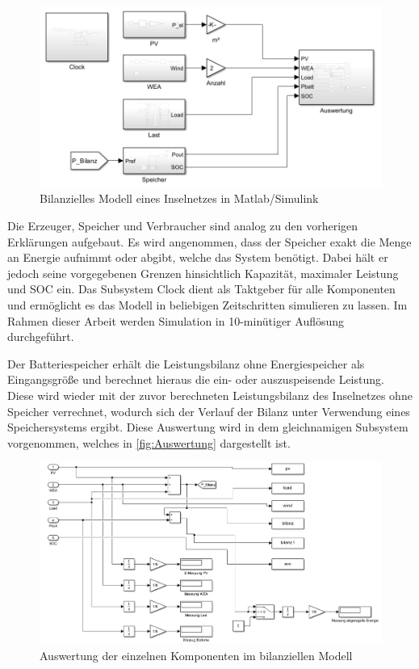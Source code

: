 \begin{figure}[H]
	\centering
	\includegraphics[width=0.9\linewidth]{Abbildungen/Bilanziell.png}
	\caption{Bilanzielles Modell eines Inselnetzes in Matlab/Simulink}
	\label{fig:Bilanziell}
\end{figure}

Die Erzeuger, Speicher und Verbraucher sind analog zu den vorherigen Erklärungen aufgebaut. Es wird angenommen, dass der Speicher exakt die Menge an Energie aufnimmt oder abgibt, welche das System benötigt. Dabei hält er jedoch seine vorgegebenen Grenzen hinsichtlich Kapazität, maximaler Leistung und SOC ein. Das Subsystem Clock dient als Taktgeber für alle Komponenten und ermöglicht es das Modell in beliebigen Zeitschritten simulieren zu lassen. Im Rahmen dieser Arbeit werden Simulation in 10-minütiger Auflösung durchgeführt.


Der Batteriespeicher erhält die Leistungsbilanz ohne Energiespeicher als Eingangsgröße und berechnet hieraus die ein- oder auszuspeisende Leistung. Diese wird wieder mit der zuvor berechneten Leistungsbilanz des Inselnetzes ohne Speicher verrechnet, wodurch sich der Verlauf der Bilanz unter Verwendung eines Speichersystems ergibt. Diese Auswertung wird in dem gleichnamigen Subsystem vorgenommen, welches in \autoref{fig:Auswertung} dargestellt ist.

\begin{figure}[H]
	\centering
	\includegraphics[width=0.9\linewidth]{Abbildungen/Auswertung.png}
	\caption{Auswertung der einzelnen Komponenten im bilanziellen Modell}
	\label{fig:Auswertung}
\end{figure}

